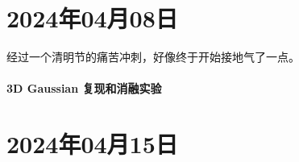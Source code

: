 \section{2024年04月08日}

经过一个清明节的痛苦冲刺，好像终于开始接地气了一点。

\paragraph{3D Gaussian 复现和消融实验}



\section{2024年04月15日}

